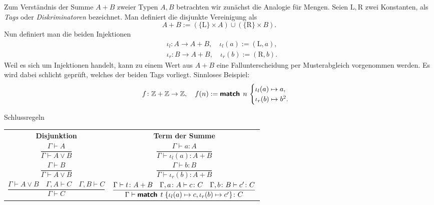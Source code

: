 \documentclass[8pt]{beamer}
\newcommand{\strong}[1]{\textsf{\textbf{#1}}}
\newcommand{\Z}{\mathbb Z}
\begin{document}
\begin{frame}
Zum Verständnis der Summe $A+B$ zweier Typen $A,B$ betrachten wir
zunächst die Analogie für Mengen. Seien $\mathrm L,\mathrm R$
zwei Konstanten, als \emph{Tags} oder \emph{Diskriminatoren} bezeichnet.
Man definiert die disjunkte Vereinigung als
\[A+B := (\{\mathrm L\}\times A)\cup (\{\mathrm R\}\times B).\]\pause
Nun definiert man die beiden Injektionen
\begin{align*}
&\iota_l\colon A\to A+B,\quad\iota_l(a) := (\mathrm L, a),\\
&\iota_r\colon B\to A+B,\quad\iota_r(b) := (\mathrm R, b).
\end{align*}
Weil es sich um Injektionen handelt, kann zu einem Wert aus $A+B$
eine Fallunterscheidung per Musterabgleich vorgenommen werden.
Es wird dabei schlicht geprüft, welches der beiden Tags vorliegt.\pause{}
Sinnloses Beispiel:
\[f\colon\Z+\Z\to\Z,\quad f(n) := \strong{match}\;\,n\,\begin{cases}
\iota_l(a)\mapsto a,\\
\iota_r(b)\mapsto b^2.
\end{cases}\]
\end{frame}

\begin{frame}
\begin{block}{Schlussregeln}
\begin{center}
\begin{tabular}{c@{\qquad\qquad}c}
\strong{Disjunktion}
& \strong{Term der Summe}\\[10pt]
$\dfrac{\Gamma\vdash A}{\Gamma\vdash A\lor B}$
& $\dfrac{\Gamma\vdash a\colon A}{\Gamma\vdash\iota_l(a)\colon A+B}$\\[18pt]
$\dfrac{\Gamma\vdash B}{\Gamma\vdash A\lor B}$
& $\dfrac{\Gamma\vdash b\colon B}{\Gamma\vdash\iota_r(b)\colon A+B}$\\[18pt]
$\dfrac{\Gamma\vdash A\lor B\quad\Gamma,A\vdash C\quad\Gamma,B\vdash C}{\Gamma\vdash C}$
& $\dfrac{\Gamma\vdash t\colon A+B\quad\Gamma,a\colon A\vdash c\colon C
  \quad\Gamma,b\colon B\vdash c'\colon C}{\Gamma\vdash\strong{match}\;\,t\;\{\iota_l(a)\mapsto c, \iota_r(b)\mapsto c'\}\colon C}$
\end{tabular}
\end{center}
\end{block}
\end{frame}
\end{document}
